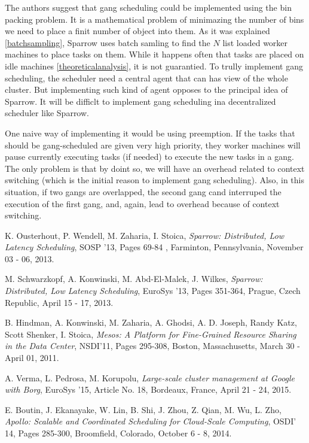 \documentclass[11pt]{article}
\begin{document}
		The authors \cite[section 8]{sparrow} suggest that gang scheduling could be implemented using the bin packing problem. It is a mathematical problem of minimazing the number of bins we need to place a finit number of object into them. As it was explained \ref{batchsampling}, Sparrow uses batch samling to find the $N$ list loaded worker machines to place tasks on them. While it happens often that tasks are placed on idle machines \ref{theoreticalanalysis}, it is not guarantied. To trully implement gang scheduling, the scheduler need a central agent that can has view of the whole cluster. But implementing such kind of agent opposes to the principal idea of Sparrow. It will be difficlt to implement gang scheduling ina decentralized scheduler like Sparrow.
		
		One naive way of implementing it would be using preemption. If the tasks that should be gang-scheduled are given very high priority, they worker machines will pause currently executing tasks (if needed) to execute the new tasks in a gang. The only problem is that by doint so, we will have an overhead related to context switching (which is the initial reason to implement gang scheduling). Also, in this situation, if two gangs are overlapped, the second gang cand interruped the execution of the first gang, and, again, lead to overhead because of context switching.
			
		




\begin{thebibliography}{9}

  K. Ousterhout, P. Wendell, M. Zaharia, I. Stoica,
  \textit{Sparrow: Distributed, Low Latency Scheduling},
  SOSP '13,
  Pages 69-84 ,
  Farminton, Pennsylvania,
  November 03 - 06,
  2013.

  M. Schwarzkopf, A. Konwinski, M. Abd-El-Malek, J. Wilkes,
  \textit{Sparrow: Distributed, Low Latency Scheduling},
  EuroSys '13,
  Pages 351-364,
  Prague, Czech Republic,
  April 15 - 17,
  2013.
  
  B. Hindman, A. Konwinski, M. Zaharia, A. Ghodsi, A. D. Joseph, Randy Katz, Scott Shenker, I. Stoica,
  \textit{Mesos: A Platform for Fine-Grained Resource Sharing in the Data Center},
  NSDI'11,
  Pages 295-308,
  Boston, Massachusetts,
  March 30 - April 01,
  2011.
  
  A. Verma, L. Pedrosa, M. Korupolu,
  \textit{Large-scale cluster management at Google with Borg},
  EuroSys '15,
  Article No. 18,
  Bordeaux, France,
  April 21 - 24,
  2015.

  E. Boutin, J. Ekanayake, W. Lin, B. Shi, J. Zhou, Z. Qian, M. Wu, L. Zho,
  \textit{Apollo: Scalable and Coordinated Scheduling for Cloud-Scale Computing},
  OSDI' 14,
  Pages 285-300,
  Broomfield, Colorado,
  October 6 - 8,
  2014.

\end{thebibliography}
\end{document}
